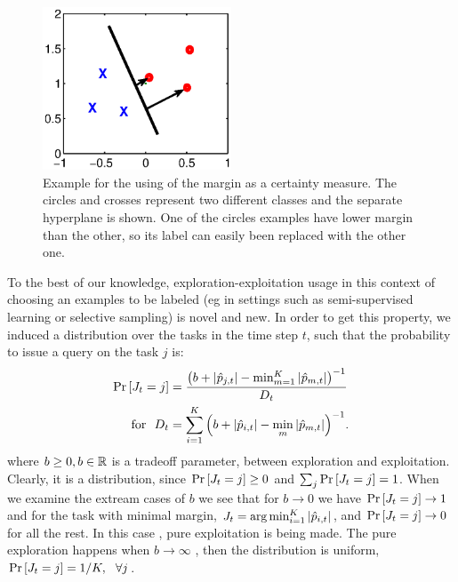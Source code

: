 \begin{figure}[h]
\begin{centering}
\includegraphics[width=0.5\textwidth]{figs/margin.eps}
\caption{Example for the using of the margin as a certainty measure. The circles and crosses represent two different classes and the separate hyperplane is shown. One of the circles examples have lower margin than the other, so its label can easily been replaced with the other one.}
\label{fig:margin}
\end{centering}
\end{figure}


To the best of our knowledge,
exploration-exploitation usage in this context of choosing an examples
to be labeled (eg in settings such as semi-supervised learning or
selective sampling) is novel and new.  In order to get this property, we induced a
distribution over the tasks in the time step $t$, such that the probability to issue a query on the task $j$ is:
\begin{equation}
\begin{aligned}
{\rm Pr}\left[{J_t=j}\right]&=\frac{\left({b+\left\vert{\hat{p}_{j,t}}\right\vert-\min_{m=1}^K\left\vert{\hat{p}_{m,t}}\right\vert}\right)^{-1}}{D_t}\\
~ \textrm { for } ~
D_{t}&=\sum_{i=1}^{K}{\left({b+\left\vert{\hat{p}_{i,t}}\right\vert-\min_{m}\left\vert{\hat{p}_{m,t}}\right\vert}\right)^{-1}}.
\label{prob}
\end{aligned}
\end{equation} 
where $b\geq 0, b\in\mathbb{R}$ is a tradeoff parameter, between exploration and
exploitation. Clearly, it is a distribution, since ${\rm Pr}\left[{J_t=j}\right]\geq 0$ and $\sum_j {\rm Pr}\left[{J_t=j}\right]=1$. When we examine the extream cases  of $b$ we see that  for $b\rightarrow0$
we have ${\rm Pr}\left[{J_t=j}\right]\rightarrow1$ and  for the task with minimal margin, $J_t=\arg\min_{i=1}^K\left\vert{\hat{p}_{i,t}}\right\vert$,  and ${\rm Pr}\left[{J_t=j}\right]\rightarrow0$ for all the rest. In this case , pure exploitation is being made. The pure exploration happens when   $b\rightarrow \infty$
, then the distribution is uniform, $ {\rm Pr}\left[{J_t=j}\right]= 1/K,~~ \forall j $.  

